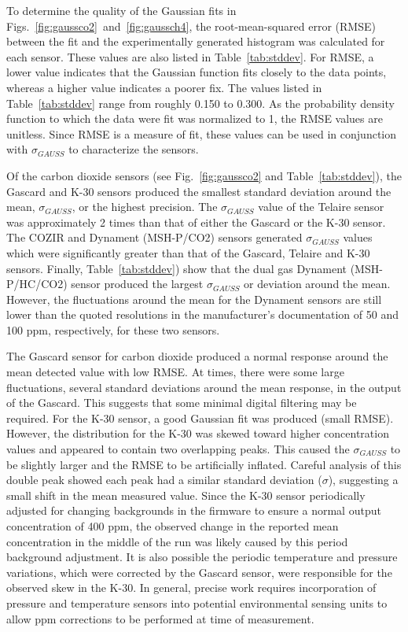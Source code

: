 \documentclass[sensors,article,submit,moreauthors,pdftex]{Definitions/mdpi}
\begin{document}
			To determine the quality of the Gaussian fits in Figs.~\ref{fig:gaussco2}~and~\ref{fig:gaussch4}, the root-mean-squared error (RMSE) between the fit and the experimentally generated histogram was calculated for each sensor.
			These values are also listed in Table~\ref{tab:stddev}.
			For RMSE, a lower value indicates that the Gaussian function fits closely to the data points, whereas a higher value indicates a poorer fix.
			 The values listed in Table~\ref{tab:stddev} range from roughly 0.150 to 0.300.
			As the probability density function to which the data were fit was normalized to 1, the RMSE values are unitless.
			Since RMSE is a measure of fit, these values can be used in conjunction with $\sigma_{GAUSS}$ to characterize the sensors.
			
			
			Of the carbon dioxide sensors (see Fig.~\ref{fig:gaussco2} and Table~\ref{tab:stddev}), the Gascard and K-30 sensors produced the smallest standard deviation around the mean, $\sigma_{GAUSS}$, or the highest precision.
			The $\sigma_{GAUSS}$ value of the Telaire sensor was approximately 2 times than that of either the Gascard or the K-30 sensor.
			The COZIR and Dynament (MSH-P/CO2) sensors generated $\sigma_{GAUSS}$ values which were significantly greater than that of the Gascard, Telaire and K-30 sensors.
			Finally, Table~\ref{tab:stddev}) show that the dual gas Dynament (MSH-P/HC/CO2) sensor produced the largest $\sigma_{GAUSS}$ or deviation around the mean. However, the fluctuations around the mean for the Dynament sensors are still lower than the quoted resolutions in the manufacturer's documentation of 50 and 100 ppm, respectively, for these two sensors.
			
			The Gascard sensor for carbon dioxide produced a normal response around the mean detected value with low RMSE.
			At times, there were some large fluctuations, several standard deviations around the mean response, in the output of the Gascard.
			This suggests that some minimal digital filtering may be required.
			For the K-30 sensor, a good Gaussian fit was produced (small RMSE).
			However, the distribution for the K-30 was skewed toward higher concentration values and appeared to contain two overlapping peaks. This caused the $\sigma_{GAUSS}$ to be slightly larger and the RMSE to be artificially inflated.
			Careful analysis of this double peak showed each peak had a similar standard deviation ($\sigma$), suggesting a small shift in the mean measured value.
			Since the K-30 sensor periodically adjusted for changing backgrounds in the firmware to ensure a normal output concentration of 400 ppm, the observed change in the reported mean concentration in the middle of the run was likely caused by this period background adjustment.
			It is also possible the periodic temperature and pressure variations, which were corrected by the Gascard sensor, were responsible for the observed skew in the K-30.
			In general, precise work requires incorporation of pressure and temperature sensors into potential environmental sensing units to allow ppm corrections to be performed at time of measurement.
			
\end{document}
